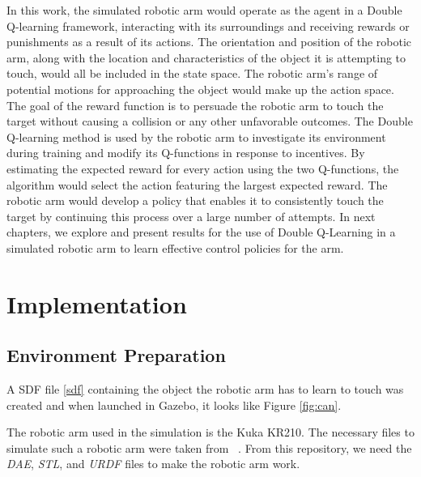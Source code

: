\documentclass[12pt,oneside]{article}
\begin{document}
In this work, the simulated robotic arm would operate as the agent in a Double Q-learning framework, interacting with its surroundings and receiving rewards or punishments as a result of its actions. The orientation and position of the robotic arm, along with the location and characteristics of the object it is attempting to touch, would all be included in the state space. The robotic arm's range of potential motions for approaching the object would make up the action space. The goal of the reward function is to persuade the robotic arm to touch the target without causing a collision or any other unfavorable outcomes.
The Double Q-learning method is used by the robotic arm to investigate its environment during training and modify its Q-functions in response to incentives. By estimating the expected reward for every action using the two Q-functions, the algorithm would select the action featuring the largest expected reward. The robotic arm would develop a policy that enables it to consistently touch the target by continuing this process over a large number of attempts. In next chapters, we explore and present results for the use of Double Q-Learning in a simulated robotic arm to learn effective control policies for the arm.

%
\section{Implementation}\label{sec:umsetzung}
\subsection{Environment Preparation}\label{sec:env-preparation}
A SDF file \ref{sdf} containing the object the robotic arm has to learn to touch was created and when launched in Gazebo, it looks like Figure \ref{fig:can}.

The robotic arm used in the simulation is the Kuka KR210. The necessary files to simulate such a robotic arm were taken from ~\cite{RoboND-Kinematics-Project}. From this repository, we need the \textit{DAE}, \textit{STL}, and \textit{URDF} files to make the robotic arm work.
\end{document}
